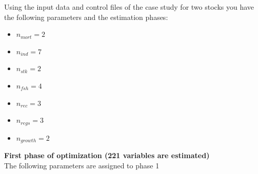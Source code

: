 \documentclass{article}
\begin{document}







Using the input data and control files of the case study for two stocks you have the following parameters and the estimation phases:
\begin{itemize}
    \item $n_{mort}=2$
    \item $n_{ind}=7$
    \item $n_{stk}=2$
    \item $n_{fsh}=4$
    \item $n_{rec}=3$
    \item $n_{regs}=3$
    \item $n_{growth}=2$
\end{itemize}
\textbf{First phase of optimization (221 variables are estimated)}\\
The following parameters are assigned to phase 1
\end{document}

